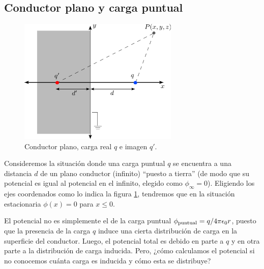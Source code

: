 \subsection{Conductor plano y carga puntual}
\begin{figure}[!h]
\centerline{\includegraphics[height=6cm]{fig/fig-carga-imagen-01.pdf}}
\caption{Conductor plano, carga real $q$ e imagen $q'$.}
\label{ci01}
\end{figure}
Consideremos la situación donde una carga puntual $q$ se encuentra a una distancia $d$ de un plano conductor (infinito) ``puesto a tierra'' (de modo que su potencial es igual al potencial en el infinito, elegido como $\phi_\infty=0$). Eligiendo los ejes coordenados como lo indica la figura \ref{ci01}, tendremos que en la situación estacionaria $\phi(x)=0$ para $x\le 0$. 

El potencial no es simplemente el de la carga puntual $\phi_{\rm puntual} = {q}/{4\pi\epsilon_0 r}$, puesto que la presencia de la carga $q$ induce una cierta distribución de carga en la superficie del conductor. Luego, el potencial total es debido en parte a $q$ y en otra parte a la distribución de carga inducida. Pero, ¿cómo calculamos el potencial si no conocemos cuánta carga es inducida y cómo esta se distribuye? 

